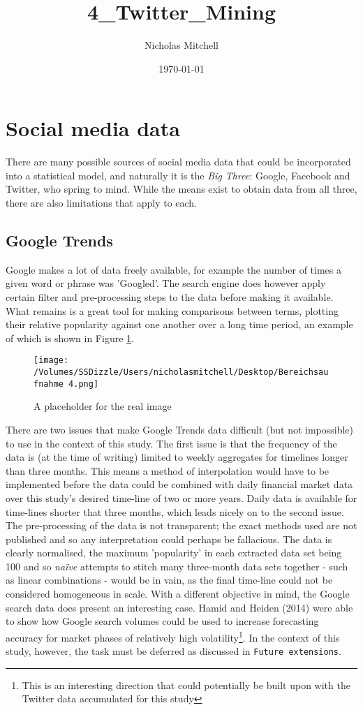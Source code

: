 \documentclass{article}
\author{Nicholas Mitchell}
\date{\today}
\title{4\_Twitter\_Mining}
\begin{document}
\maketitle
\tableofcontents


\section{Social media data}
\label{sec-1}

There are many possible sources of social media data that could be incorporated into a statistical model, and naturally it is the \emph{Big Three}: Google, Facebook and Twitter, who spring to mind. While the means exist to obtain data from all three, there are also limitations that apply to each.


\subsection{Google Trends}
\label{sec-1-1}
Google makes a lot of data freely available, for example the number of times a given word or phrase was 'Googled'. The search engine does however apply certain filter and pre-processing steps to the data before making it available. What remains is a great tool for making comparisons between terms, plotting their relative popularity against one another over a long time period, an example of which is shown in Figure \ref{img:funny}. 

\begin{figure}[htb]
\centering
\texttt{[image: /Volumes/SSDizzle/Users/nicholasmitchell/Desktop/Bereichsaufnahme 4.png]}
\caption{\label{img:funny}A placeholder for the real image}
\end{figure}


There are two issues that make Google Trends data difficult (but not impossible) to use in the context of this study. The first issue is that the frequency of the data is (at the time of writing) limited to weekly aggregates for timelines longer than three months. This means a method of interpolation would have to be implemented before the data could be combined with daily financial market data over this study's desired time-line of two or more years. Daily data is available for time-lines shorter that three months, which leads nicely on to the second issue. The pre-processing of the data is not transparent; the exact methods used are not published and so any interpretation could perhaps be fallacious. The data is clearly normalised, the maximum 'popularity' in each extracted data set being 100 and so \emph{naïve} attempts to stitch many three-month data sets together - such as linear combinations - would be in vain, as the final time-line could not be considered homogeneous in scale. With a different objective in mind, the Google search data does present an interesting case. Hamid and Heiden (2014) were able to show how Google search volumes could be used to increase forecasting accuracy for market phases of relatively high volatility\footnote{This is an interesting direction that could potentially be built upon with the Twitter data accumulated for this study}. In the context of this study, however, the task must be deferred as discussed in \texttt{Future extensions}.
\end{document}
